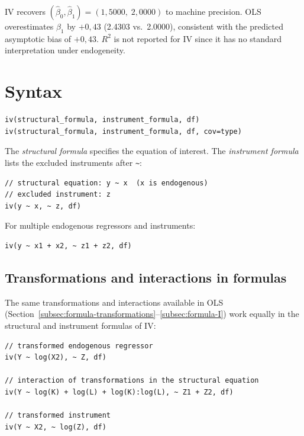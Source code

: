 IV recovers $(\hat\beta_0, \hat\beta_1) = (1{,}5000,\; 2{,}0000)$ to machine
precision. OLS overestimates $\beta_1$ by $+0{,}43$ (2.4303 vs.\ 2.0000),
consistent with the predicted asymptotic bias of $+0{,}43$.
$R^2$ is not reported for IV since it has no standard interpretation under endogeneity.

\section{Syntax}

\begin{lstlisting}
iv(structural_formula, instrument_formula, df)
iv(structural_formula, instrument_formula, df, cov=type)
\end{lstlisting}

The \textit{structural formula} specifies the equation of interest. The
\textit{instrument formula} lists the excluded instruments after \lstinline{~}:

\begin{lstlisting}[caption={Basic IV --- one instrument}]
// structural equation: y ~ x  (x is endogenous)
// excluded instrument: z
iv(y ~ x, ~ z, df)
\end{lstlisting}

For multiple endogenous regressors and instruments:

\begin{lstlisting}
iv(y ~ x1 + x2, ~ z1 + z2, df)
\end{lstlisting}

\subsection{Transformations and interactions in formulas}
\label{subsec:iv-formula-advanced}

The same transformations and interactions available in OLS
(Section~\ref{subsec:formula-transformations}--\ref{subsec:formula-I})
work equally in the structural and instrument formulas of IV:

\begin{lstlisting}[caption={IV with transformations and interactions}]
// transformed endogenous regressor
iv(Y ~ log(X2), ~ Z, df)

// interaction of transformations in the structural equation
iv(Y ~ log(K) + log(L) + log(K):log(L), ~ Z1 + Z2, df)

// transformed instrument
iv(Y ~ X2, ~ log(Z), df)
\end{lstlisting}

